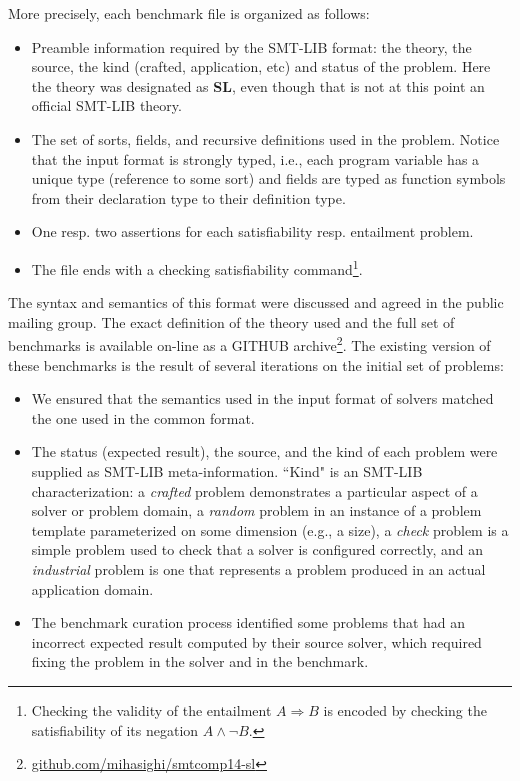 \documentclass[twoside,11pt]{article}
\newcommand{\limp}{\Rightarrow}
\newcommand{\SLEEK}{\textsc{Sleek}}
\begin{document}
More precisely, each benchmark file is organized as follows:
\begin{itemize}
\item Preamble information required by the SMT-LIB format: the theory, the source, the kind (crafted, application, etc) and status of the problem.  Here the theory was designated as \textbf{SL}, even though that is not at this point an official SMT-LIB theory. %
\item The set of sorts, fields, and recursive definitions used in the problem. Notice that the input format is strongly typed, i.e., each program variable has a unique type (reference to some sort) and 
fields are typed as function symbols from their declaration type to their definition type. 
\item One resp. two assertions for each satisfiability resp. entailment problem. 
\item The file ends with a checking satisfiability command\footnote{Checking the validity of the entailment $A\limp B$ is encoded by checking the satisfiability of its negation $A \land \lnot B$.}.
\end{itemize}

The syntax and semantics of this format were discussed and agreed in the public mailing group. 
The exact definition of the theory used and the full set of benchmarks is available on-line as a GITHUB archive\footnote{\url{github.com/mihasighi/smtcomp14-sl}}.
The existing version of these benchmarks is the result of several iterations on the initial set of problems:
\begin{itemize}
\item We ensured that the semantics used in the input format of solvers matched the one used in the common format. 
\item The status (expected result), the source, and the kind of each problem were supplied as SMT-LIB meta-information. ``Kind" is an SMT-LIB characterization: a \textit{crafted} problem demonstrates a particular aspect of a solver or problem domain, a \textit{random} problem in an instance of a problem template parameterized on some dimension (e.g., a size), a \textit{check} problem is a simple problem used to check that a solver is configured correctly, and an \textit{industrial} problem is one that represents a problem produced in an actual application domain.
\item The benchmark curation process identified some problems that had an incorrect expected result computed by their source solver, which required fixing the problem in the solver and in the benchmark.
\end{itemize}
\end{document}
